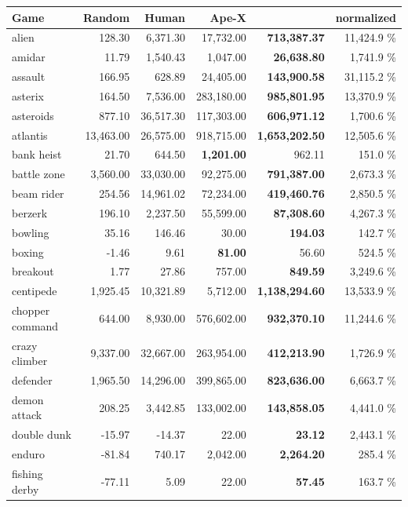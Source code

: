 \begin{center}\begin{tabularx}{0.750000\textwidth}{X| r r r r r}
\toprule
Game & Random & Human & Ape-X \cite{apex} & \muzero{} & \muzero{} normalized \\
\midrule
alien &128.30 & 6,371.30 & 17,732.00 & \textbf{713,387.37} & 11,424.9 \%\\
amidar &11.79 & 1,540.43 & 1,047.00 & \textbf{26,638.80} & 1,741.9 \%\\
assault &166.95 & 628.89 & 24,405.00 & \textbf{143,900.58} & 31,115.2 \%\\
asterix &164.50 & 7,536.00 & 283,180.00 & \textbf{985,801.95} & 13,370.9 \%\\
asteroids &877.10 & 36,517.30 & 117,303.00 & \textbf{606,971.12} & 1,700.6 \%\\
atlantis &13,463.00 & 26,575.00 & 918,715.00 & \textbf{1,653,202.50} & 12,505.6 \%\\
bank heist &21.70 & 644.50 & \textbf{1,201.00} & 962.11 & 151.0 \%\\
battle zone &3,560.00 & 33,030.00 & 92,275.00 & \textbf{791,387.00} & 2,673.3 \%\\
beam rider &254.56 & 14,961.02 & 72,234.00 & \textbf{419,460.76} & 2,850.5 \%\\
berzerk &196.10 & 2,237.50 & 55,599.00 & \textbf{87,308.60} & 4,267.3 \%\\
bowling &35.16 & 146.46 & 30.00 & \textbf{194.03} & 142.7 \%\\
boxing &-1.46 & 9.61 & \textbf{81.00} & 56.60 & 524.5 \%\\
breakout &1.77 & 27.86 & 757.00 & \textbf{849.59} & 3,249.6 \%\\
centipede &1,925.45 & 10,321.89 & 5,712.00 & \textbf{1,138,294.60} & 13,533.9 \%\\
chopper command &644.00 & 8,930.00 & 576,602.00 & \textbf{932,370.10} & 11,244.6 \%\\
crazy climber &9,337.00 & 32,667.00 & 263,954.00 & \textbf{412,213.90} & 1,726.9 \%\\
defender &1,965.50 & 14,296.00 & 399,865.00 & \textbf{823,636.00} & 6,663.7 \%\\
demon attack &208.25 & 3,442.85 & 133,002.00 & \textbf{143,858.05} & 4,441.0 \%\\
double dunk &-15.97 & -14.37 & 22.00 & \textbf{23.12} & 2,443.1 \%\\
enduro &-81.84 & 740.17 & 2,042.00 & \textbf{2,264.20} & 285.4 \%\\
fishing derby &-77.11 & 5.09 & 22.00 & \textbf{57.45} & 163.7 \%\\

\end{tabularx}
\end{center}
